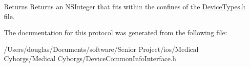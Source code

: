\begin{DoxyReturn}{Returns}
Returns an N\-S\-Integer that fits within the confines of the \hyperlink{_device_types_8h_source}{Device\-Types.\-h} file. 
\end{DoxyReturn}


The documentation for this protocol was generated from the following file\-:\begin{DoxyCompactItemize}
\item 
/\-Users/douglas/\-Documents/software/\-Senior Project/ios/\-Medical Cyborgs/\-Medical Cyborgs/Device\-Common\-Info\-Interface.\-h\end{DoxyCompactItemize}
